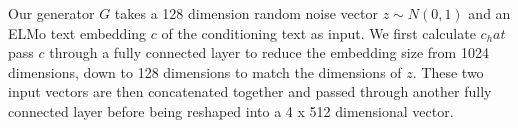 Our generator $G$ takes a 128 dimension random noise vector $z \sim N(0, 1)$ and an ELMo text embedding $c$ of the conditioning text as input. We first calculate $c_hat$ pass $c$ through a fully connected layer to reduce the embedding size from 1024 dimensions, down to 128 dimensions to match the dimensions of $z$. These two input vectors are then concatenated together and passed through another fully connected layer before being reshaped into a 4 x 512 dimensional vector.